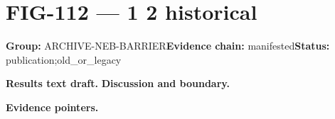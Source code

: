 \clearpage
\section{FIG-112 --- 1 2 historical}
\label{figpage:fig-112}
\textbf{Group:} ARCHIVE-NEB-BARRIER\quad \textbf{Evidence chain:} manifested\quad \textbf{Status:} publication;old\_or\_legacy

\textbf{Results text draft.} 
\textbf{Discussion and boundary.} 


\textbf{Evidence pointers.}



\vfill
